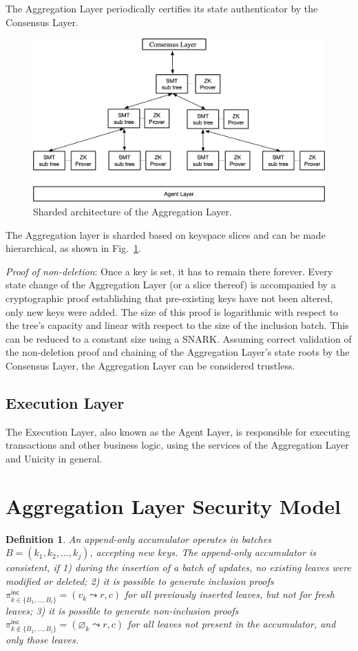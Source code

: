 \documentclass[twocolumn]{article}
\newtheorem{definition}{Definition}
\begin{document}
The Aggregation Layer periodically certifies its state authenticator by the Consensus Layer.

\begin{figure}[!t]
    \centering
    \includegraphics[width=.7\textwidth]{pic/layers}
    \caption{Sharded architecture of the Aggregation Layer.}\label{fig:sharding}
\end{figure}

The Aggregation layer is sharded based on keyspace slices and can be made hierarchical, as shown in Fig.~\ref{fig:sharding}.

\emph{Proof of non-deletion}: Once a key is set, it has to remain there forever. Every state change of the Aggregation Layer (or a slice thereof) is accompanied by a cryptographic proof establishing that pre-existing keys have not been altered, only new keys were added. The size of this proof is logarithmic with respect to the tree's capacity and linear with respect to the size of the inclusion batch. This can be reduced to a constant size using a SNARK. Assuming correct validation of the non-deletion proof and chaining of the Aggregation Layer's state roots by the Consensus Layer, the Aggregation Layer can be considered trustless.


\subsection{Execution Layer}

The Execution Layer, also known as the Agent Layer, is responsible for executing transactions and other business logic, using the services of the Aggregation Layer and Unicity in general.


\section{Aggregation Layer Security Model}

\begin{definition}
An append-only accumulator operates in batches $B = (k_1, k_2, \ldots, k_j)$, accepting new keys. The append-only accumulator is \emph{consistent}, if 1) during the insertion of a batch of updates, no existing leaves were modified or deleted; 2) it is possible to generate inclusion proofs $\pi^{\textsf{inc}}_{k \in \{B_1, \dots, B_i\}} = (v_k \leadsto r, c)$ for all previously inserted leaves, but not for \emph{fresh} leaves; 3) it is possible to generate non-inclusion proofs $\pi^{\overline{\textsf {inc}}}_{k \notin \{B_1, \dots, B_i\}} = (\varnothing_k \leadsto r, c)$ for all leaves not present in the accumulator, and only those leaves.
\label{def:append-only-accumulator}
\end{definition}
\end{document}
